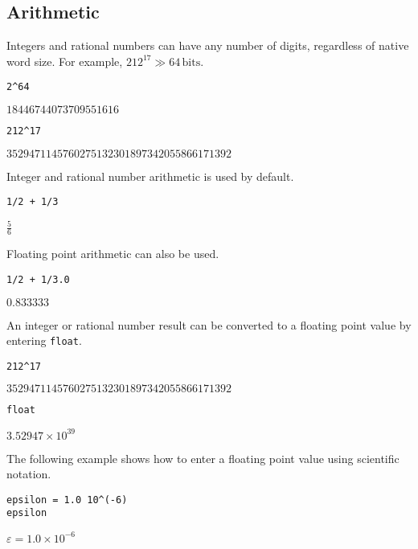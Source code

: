 \subsection{Arithmetic}

\noindent
Integers and rational numbers can have any number of digits,
regardless of native word size.
For example, $212^{17}\gg64\,\text{bits}$.

{\color{blue}
\begin{verbatim}
2^64
\end{verbatim}
}

\noindent
$\displaystyle 18446744073709551616$

{\color{blue}
\begin{verbatim}
212^17
\end{verbatim}
}

\noindent
$\displaystyle 3529471145760275132301897342055866171392$

\bigskip
\noindent
Integer and rational number arithmetic is used by default.

{\color{blue}
\begin{verbatim}
1/2 + 1/3
\end{verbatim}
}

\noindent
$\displaystyle \tfrac{5}{6}$

\bigskip
\noindent
Floating point arithmetic can also be used.

{\color{blue}
\begin{verbatim}
1/2 + 1/3.0
\end{verbatim}
}

\noindent
$\displaystyle 0.833333$

\bigskip
\noindent
An integer or rational number result can be converted to a floating
point value by entering \verb$float$.

{\color{blue}
\begin{verbatim}
212^17
\end{verbatim}
}

\noindent
$\displaystyle 3529471145760275132301897342055866171392$

{\color{blue}
\begin{verbatim}
float
\end{verbatim}
}

\noindent
$\displaystyle 3.52947\times10^{39}$

\bigskip
\noindent
The following example shows how to enter a floating point value
using scientific notation.

{\color{blue}
\begin{verbatim}
epsilon = 1.0 10^(-6)
epsilon
\end{verbatim}
}

\noindent
$\displaystyle \varepsilon=1.0\times10^{-6}$
